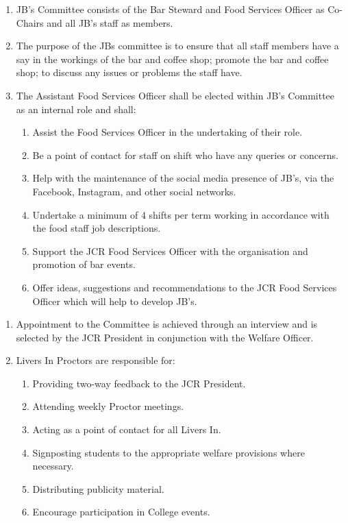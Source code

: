 \begin{enumerate}
    \item  JB’s Committee consists of the Bar Steward and Food Services Officer as Co-Chairs and all JB’s staff as members.
    \item The purpose of the JBs committee is to ensure that all staff members have a say in the workings of the bar and coffee shop; promote the bar and coffee shop; to discuss any issues or problems the staff have.
    \item The Assistant Food Services Officer shall be elected within JB’s Committee as an internal role and shall:
    \begin{enumerate}
        \item Assist the Food Services Officer in the undertaking of their role.
        \item Be a point of contact for staff on shift who have any queries or concerns.
        \item Help with the maintenance of the social media presence of JB’s, via the Facebook, Instagram, and other social networks.
        \item Undertake a minimum of 4 shifts per term working in accordance with the food staff job descriptions.
        \item Support the JCR Food Services Officer with the organisation and promotion of bar events.
        \item Offer ideas, suggestions and recommendations to the JCR Food Services Officer which will help to develop JB’s.
    \end{enumerate}
\end{enumerate}


\begin{enumerate}
    \item Appointment to the Committee is achieved through an interview and is selected by the JCR President in conjunction with the Welfare Officer.
    \item Livers In Proctors are responsible for:
    \begin{enumerate}
        \item Providing two-way feedback to the JCR President.
        \item Attending weekly Proctor meetings.
        \item Acting as a point of contact for all Livers In.
        \item Signposting students to the appropriate welfare provisions where necessary. 
        \item Distributing publicity material.
        \item Encourage participation in College events.
    \end{enumerate}
\end{enumerate}


